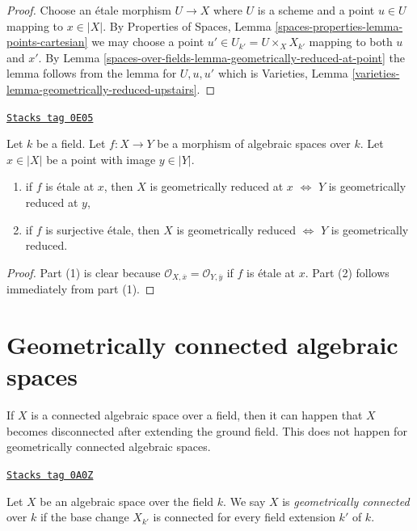 \begin{proof}
Choose an \'etale morphism $U \to X$ where $U$ is a scheme
and a point $u \in U$ mapping to $x \in |X|$.
By Properties of Spaces, Lemma \ref{spaces-properties-lemma-points-cartesian}
we may choose a point $u' \in U_{k'} = U \times_X X_{k'}$ mapping
to both $u$ and $x'$. By Lemma \ref{spaces-over-fields-lemma-geometrically-reduced-at-point}
the lemma follows from the lemma for $U, u, u'$ which is
Varieties, Lemma \ref{varieties-lemma-geometrically-reduced-upstairs}.
\end{proof}

\begin{lemma}
\label{spaces-over-fields-lemma-geometrically-reduced-etale-local}
\href{https://stacks.math.columbia.edu/tag/0E05}{\texttt{Stacks tag 0E05}}

Let $k$ be a field. Let $f : X \to Y$ be a morphism of
algebraic spaces over $k$. Let $x \in |X|$ be a point
with image $y \in |Y|$.
\begin{enumerate}
\item if $f$ is \'etale at $x$, then
$X$ is geometrically reduced at $x$ $\Leftrightarrow$
$Y$ is geometrically reduced at $y$,
\item if $f$ is surjective \'etale, then
$X$ is geometrically reduced $\Leftrightarrow$
$Y$ is geometrically reduced.
\end{enumerate}
\end{lemma}

\begin{proof}
Part (1) is clear because
$\mathcal{O}_{X, \overline{x}} = \mathcal{O}_{Y, \overline{y}}$
if $f$ is \'etale at $x$.
Part (2) follows immediately from part (1).
\end{proof}

\section{Geometrically connected algebraic spaces}
\label{spaces-over-fields-section-geometrically-connected}
If $X$ is a connected algebraic space over a field, then it can happen that
$X$ becomes disconnected after extending the ground field. This does not
happen for geometrically connected algebraic spaces.

\begin{definition}
\label{spaces-over-fields-definition-geometrically-connected}
\href{https://stacks.math.columbia.edu/tag/0A0Z}{\texttt{Stacks tag 0A0Z}}

Let $X$ be an algebraic space over the field $k$. We say $X$ is
{\it geometrically connected} over $k$ if the base change $X_{k'}$
is connected for every field extension $k'$ of $k$.
\end{definition}

